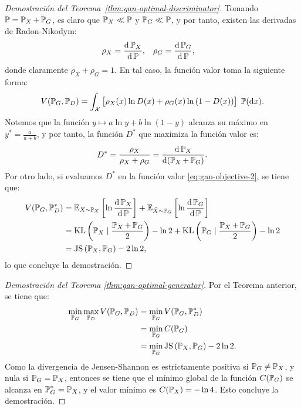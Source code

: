 {\begin{proof}[Demostración del Teorema~\ref{thm:gan-optimal-discriminator}]
        Tomando $\Prob = \Prob_X + \Prob_G$, es claro que $\Prob_X \ll \Prob$ y $\Prob_G \ll \Prob$, y por tanto, existen las derivadas de Radon-Nikodym:
        \begin{align*}
            \rho_X & = \dv{\Prob_X}{\Prob}, & \rho_G & = \dv{\Prob_G}{\Prob},
        \end{align*}
        donde claramente $\rho_X + \rho_G = 1$. En tal caso, la función valor toma la siguiente forma:
        \begin{equation}
            \label{eq:gan-objective-2}
            V(\Prob_G, \Prob_D) = \int_\cX \big[ \rho_X(x) \ln D(x) + \rho_G(x) \ln \qty(1 - D(x)) \big] \; \Prob(\dd x).
        \end{equation}
        Notemos que la función $y \mapsto a \ln y + b \ln(1-y)$ alcanza su máximo en $y^\ast = \frac{a}{a+b}$, y por tanto, la función $D^\ast$ que maximiza la función valor es:
        \begin{equation}
            D^\ast = \frac{\rho_X}{\rho_X + \rho_G} = \dv{\Prob_X}{(\Prob_X + \Prob_G)} .
        \end{equation}
        Por otro lado, si evaluamos $D^\ast$ en la función valor \eqref{eq:gan-objective-2}, se tiene que:
        \begin{align*}
            V(\Prob_G, \Prob_D^\ast)
             & = \Exp_{X \sim \Prob_X} \left[ \ln \dv{\Prob_X}{\Prob}(X) \right] + \Exp_{\tilde X \sim \Prob_G} \left[ \ln \dv{\Prob_G}{\Prob}(\tilde X) \right] \\
             & = \KL{\Prob_X}{\frac{\Prob_X + \Prob_G}{2}} - \ln 2 + \KL{\Prob_G}{\frac{\Prob_X + \Prob_G}{2}} - \ln 2                                           \\
             & = \JS{\Prob_X}{\Prob_G} - 2 \ln 2,
        \end{align*}
        lo que concluye la demostración.
    \end{proof}

    \begin{proof}[Demostración del Teorema \ref{thm:gan-optimal-generator}]
        Por el Teorema anterior, se tiene que:
        \begin{align*}
            \min_{\Prob_G} \max_{\Prob_D} V(\Prob_G, \Prob_D)
             & = \min_{\Prob_G} V(\Prob_G, \Prob_D^\ast)         \\
             & = \min_{\Prob_G} C(\Prob_G)                       \\
             & = \min_{\Prob_G} \JS{\Prob_X}{\Prob_G} - 2 \ln 2.
        \end{align*}
        Como la divergencia de Jensen-Shannon es estrictamente positiva si $\Prob_G \neq \Prob_X$, y nula si $\Prob_G = \Prob_X$, entonces se tiene que el mínimo global de la función $C(\Prob_G)$ se alcanza en $\Prob_G^\ast = \Prob_X$, y el valor mínimo es $C(\Prob_X) = - \ln 4$. Esto concluye la demostración.
    \end{proof}

}  %